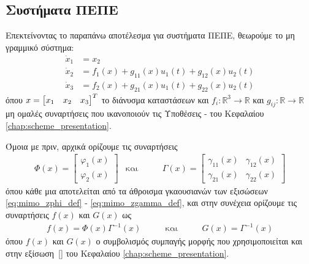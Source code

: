 \subsection{Συστήματα ΠΕΠΕ}
\label{subsec:rbf_mimo}
Επεκτείνοντας το παραπάνω αποτέλεσμα για συστήματα ΠΕΠΕ, θεωρούμε το μη γραμμικό σύστημα:
\begin{equation*}
\label{eq:third_order_plant}
\begin{split}
\dot{x}_1 &= x_{2}  \\
\dot{x}_2 &= f_1(x) + g_{11}(x)u_1(t) + g_{12}(x)u_2(t) \\
\dot{x}_3 &= f_2(x) + g_{21}(x)u_1(t) + g_{22}(x)u_2(t)
\end{split}
\end{equation*}
όπου $x = \bmqty{x_1 & x_2 & x_3}^T$ το διάνυσμα καταστάσεων και $f_i : \mathbb{R}^3 \rightarrow \mathbb{R}$ και $g_{ij}:\mathbb{R} \rightarrow \mathbb{R}$ μη ομαλές συναρτήσεις που ικανοποιούν τις Υποθέσεις  - του Κεφαλαίου \ref{chap:scheme_presentation}.

Όμοια με πριν, αρχικά ορίζουμε τις συναρτήσεις
\begin{equation*}
\begin{matrix}
\Phi(x) =  \begin{bmatrix}
\varphi_1(x) \\
\varphi_2(x)
\end{bmatrix}
& \text{και} \qquad  & \Gamma(x) = \begin{bmatrix}
\gamma_{11}(x) & \gamma_{12}(x) \\
\gamma_{21}(x) & \gamma_{22}(x)
\end{bmatrix}
\end{matrix}
\end{equation*}
όπου κάθε μια αποτελείται από τα άθροισμα γκαουσιανών των εξισώσεων \eqref{eq:mimo_zphi_def} - \eqref{eq:mimo_zgamma_def}, και στην συνέχεια ορίζουμε τις συναρτήσεις $f(x)$ και $G(x)$ ως
\begin{equation*}
\begin{matrix}
f(x) =  \Phi(x) \Gamma^{-1}(x) \qquad
& \text{και} \qquad  & G(x) = \Gamma^{-1}(x)
\end{matrix}
\end{equation*}
όπου $f(x)$ και $G(x)$ ο συμβολισμός συμπαγής μορφής που χρησιμοποιείται και στην εξίσωση~\eqref{} του Κεφαλαίου \ref{chap:scheme_presentation}.

